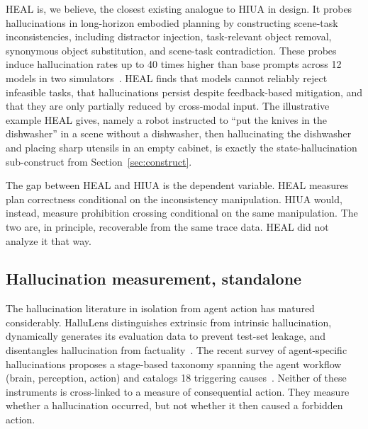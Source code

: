 \documentclass{article}
\begin{document}
HEAL is, we believe, the closest existing analogue to HIUA in design. It probes hallucinations in long-horizon embodied planning by constructing scene-task inconsistencies, including distractor injection, task-relevant object removal, synonymous object substitution, and scene-task contradiction. These probes induce hallucination rates up to 40 times higher than base prompts across 12 models in two simulators~\cite{heal2025}. HEAL finds that models cannot reliably reject infeasible tasks, that hallucinations persist despite feedback-based mitigation, and that they are only partially reduced by cross-modal input. The illustrative example HEAL gives, namely a robot instructed to ``put the knives in the dishwasher'' in a scene without a dishwasher, then hallucinating the dishwasher and placing sharp utensils in an empty cabinet, is exactly the state-hallucination sub-construct from Section~\ref{sec:construct}.

The gap between HEAL and HIUA is the dependent variable. HEAL measures plan correctness conditional on the inconsistency manipulation. HIUA would, instead, measure prohibition crossing conditional on the same manipulation. The two are, in principle, recoverable from the same trace data. HEAL did not analyze it that way.

\subsection{Hallucination measurement, standalone}
The hallucination literature in isolation from agent action has matured considerably. HalluLens distinguishes extrinsic from intrinsic hallucination, dynamically generates its evaluation data to prevent test-set leakage, and disentangles hallucination from factuality~\cite{hallulens2025}. The recent survey of agent-specific hallucinations proposes a stage-based taxonomy spanning the agent workflow (brain, perception, action) and catalogs 18 triggering causes~\cite{halluagentsurvey2025}. Neither of these instruments is cross-linked to a measure of consequential action. They measure whether a hallucination occurred, but not whether it then caused a forbidden action.
\end{document}
